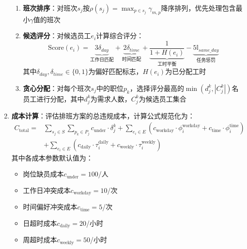 \documentclass{ctexart}
\begin{document}
\begin{enumerate}
\begin{enumerate}
        \item \textbf{班次排序}：对班次$s_j$按$\rho(s_j)=\max_{p\in s_j}\gamma_{m,p}$降序排列，优先处理包含最小$\gamma$值的班次
        
        \item \textbf{候选评分}：对候选员工$e_i$计算综合评分：
        \begin{equation}
            \text{Score}(e_i) = \underbrace{3\delta_{day}}_{\text{工作日匹配}} + \underbrace{2\delta_{time}}_{\text{时间匹配}} + \underbrace{\frac{1}{1+H(e_i)}}_{\text{工时平衡}} - \underbrace{5\mathbb{I}_{same\_day}}_{\text{任务惩罚}}
        \end{equation}
        其中$\delta_{day},\delta_{time}\in\{0,1\}$为偏好匹配标志，$H(e_i)$为已分配工时
        
        \item \textbf{贪心分配}：对每个班次$s_j$中的职位$p_k$，选择评分最高的$\min(d_j^k, |C_j^k|)$名员工进行分配，其中$d_j^k$为需求人数，$C_j^k$为候选员工集合
    \end{enumerate}
    
    \item \textbf{成本计算}：评估排班方案的总违规成本，计算公式规范化为：
    \begin{equation}
    \begin{split}
    C_{\text{total}} = & \sum_{s_j \in S}\sum_{p_k \in P_j} c_{\text{under}} \cdot \delta_j^k + \sum_{e_i \in E}\left(c_{\text{workday}} \cdot \phi_i^{\text{workday}} + c_{\text{time}} \cdot \phi_i^{\text{time}}\right) \\
                      & + \sum_{e_i \in E}\left(c_{\text{daily}} \cdot \tau_i^{\text{daily}} + c_{\text{weekly}} \cdot \tau_i^{\text{weekly}}\right)
    \end{split}
    \end{equation}
    其中各成本参数默认值为：
    \begin{itemize}
        \item 岗位缺员成本$c_{\text{under}}=100$/人
        \item 工作日冲突成本$c_{\text{workday}}=10$/次
        \item 时间偏好冲突成本$c_{\text{time}}=5$/次
        \item 日超时成本$c_{\text{daily}}=20$/小时
        \item 周超时成本$c_{\text{weekly}}=50$/小时
    \end{itemize}
    

\end{enumerate}
\end{document}
